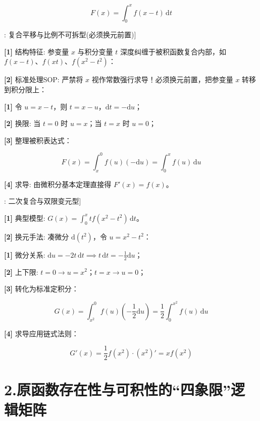 \documentclass[11pt,a4paper,UTF8]{ctexart}
\begin{document}
\begin{equation*}
F(x) = \int_0^x f(x - t)\,\mathrm{d}t
\end{equation*}
\begin{thmbox}[模型[2]: 复合平移与比例不可拆型(必须换元前置)]

\textbf{[1]} 结构特征: 参变量 $x$ 与积分变量 $t$ 深度纠缠于被积函数复合内部，如 $f(x - t)$、$f(xt)$、$f(x^2 - t^2)$：


\textbf{[2]} 标准处理SOP: 严禁将 $x$ 视作常数强行求导！必须换元前置，把参变量 $x$ 转移到积分限上：

\textbf{[1]} 令 $u = x - t$，则 $t = x - u$，$\mathrm{d}t = -\mathrm{d}u$；

\textbf{[2]} 换限: 当 $t = 0$ 时 $u = x$；当 $t = x$ 时 $u = 0$；

\textbf{[3]} 整理被积表达式：


\begin{equation*}
F(x) = \int_x^0 f(u)(-\mathrm{d}u) = \int_0^x f(u)\,\mathrm{d}u
\end{equation*}


\textbf{[4]} 求导: 由微积分基本定理直接得 $F'(x) = f(x)$。

\end{thmbox}
\begin{thmbox}[模型[3]: 二次复合与双限变元型]

\textbf{[1]} 典型模型: $G(x) = \int_0^x t f(x^2 - t^2)\,\mathrm{d}t$。

\textbf{[2]} 换元手法: 凑微分 $\mathrm{d}(t^2)$，令 $u = x^2 - t^2$：

\textbf{[1]} 微分关系: $\mathrm{d}u = -2t\,\mathrm{d}t \implies t\,\mathrm{d}t = -\frac{1}{2}\mathrm{d}u$；

\textbf{[2]} 上下限: $t = 0 \to u = x^2$；$t = x \to u = 0$；

\textbf{[3]} 转化为标准定积分：


\begin{equation*}
G(x) = \int_{x^2}^0 f(u)\left(-\frac{1}{2}\mathrm{d}u\right) = \frac{1}{2}\int_0^{x^2} f(u)\,\mathrm{d}u
\end{equation*}


\textbf{[4]} 求导应用链式法则：


\begin{equation*}
G'(x) = \frac{1}{2} f(x^2) \cdot (x^2)' = x f(x^2)
\end{equation*}


\end{thmbox}

\section{2.原函数存在性与可积性的“四象限”逻辑矩阵}
\end{document}
